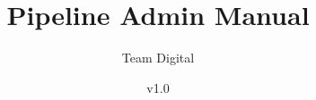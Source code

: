 \documentclass[11pt]{book}
\title{Pipeline Admin Manual}
\author{Team Digital}
\date{v1.0}
\begin{document}
\maketitle
\def\title#1{\chapter{#1}}
\tableofcontents

        
        
        
        
\end{document}
